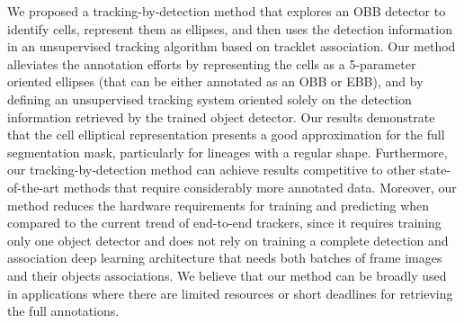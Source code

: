 \documentclass{article}
\begin{document}
We proposed a tracking-by-detection method that explores an OBB detector to identify cells,  represent them as ellipses, and then uses the detection information in an unsupervised tracking algorithm based on tracklet association. Our method alleviates the annotation efforts by representing the cells as a 5-parameter oriented ellipses (that can be either annotated as an OBB or EBB), and by defining an unsupervised tracking system oriented solely on the detection information retrieved by the trained object detector. Our results demonstrate that the cell elliptical representation presents a good approximation for the full segmentation mask, particularly for lineages with a regular shape. Furthermore, our tracking-by-detection method can achieve results competitive to other state-of-the-art methods that require considerably more annotated data. Moreover, our method reduces the hardware requirements for training and predicting when compared to the current trend of end-to-end trackers, since it requires training only one object detector and does not rely on training a complete detection and association deep learning architecture that needs both batches of frame images and their objects associations. We believe that our method can be broadly used in applications where there are limited resources or short deadlines for retrieving the full annotations.



\end{document}
